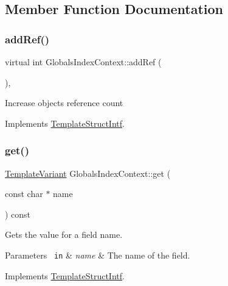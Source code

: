 \subsection{Member Function Documentation}
\mbox{\label{class_globals_index_context_a90f2b7d7fd5fab2f29660ebcc1f99db4}} 
\subsubsection{\texorpdfstring{addRef()}{addRef()}}
{\footnotesize\ttfamily virtual int Globals\+Index\+Context\+::add\+Ref (\begin{DoxyParamCaption}{ }\end{DoxyParamCaption})\hspace{0.3cm}{\ttfamily [inline]}, {\ttfamily [virtual]}}

Increase object\textquotesingle{}s reference count 

Implements \mbox{\hyperlink{class_template_struct_intf_a05fe97ad47633beb326f69686faed581}{Template\+Struct\+Intf}}.

\mbox{\label{class_globals_index_context_a9838a4354e5e962d8ec3976dbbc7ba8d}} 
\subsubsection{\texorpdfstring{get()}{get()}}
{\footnotesize\ttfamily \mbox{\hyperlink{class_template_variant}{Template\+Variant}} Globals\+Index\+Context\+::get (\begin{DoxyParamCaption}\item[{const char $\ast$}]{name }\end{DoxyParamCaption}) const\hspace{0.3cm}{\ttfamily [virtual]}}

Gets the value for a field name. 
\begin{DoxyParams}[1]{Parameters}
\mbox{\texttt{ in}}  & {\em name} & The name of the field. \\
\hline
\end{DoxyParams}


Implements \mbox{\hyperlink{class_template_struct_intf_a3d610cb81b4adbb531ebed3aa3d09b51}{Template\+Struct\+Intf}}.

